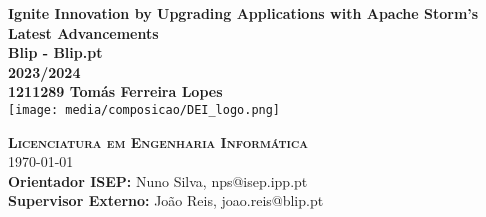 \begin{center}

\center

{\huge \bfseries Ignite Innovation by Upgrading Applications with Apache Storm's Latest Advancements}\\[.5cm]

{\bfseries Blip - Blip.pt }\\[1cm]

{\Large \bfseries 2023/2024}\\[2cm]

{\Large\bf 1211289 Tomás Ferreira Lopes }\\[2.5cm]


\texttt{[image: media/composicao/DEI\_logo.png]}


\vfill

\textsc{
    \Large \bfseries Licenciatura em Engenharia Informática
    }
\HRuleFront
\\[.5cm]

{\Large \monthyeardate\today}\\[1cm]

{{\small\bf Orientador ISEP:  } {\small Nuno Silva, nps@isep.ipp.pt}} \\[4pt]
{{\small\bf Supervisor Externo:} {\small João Reis, joao.reis@blip.pt}} \\[4pt]


\end{center}
